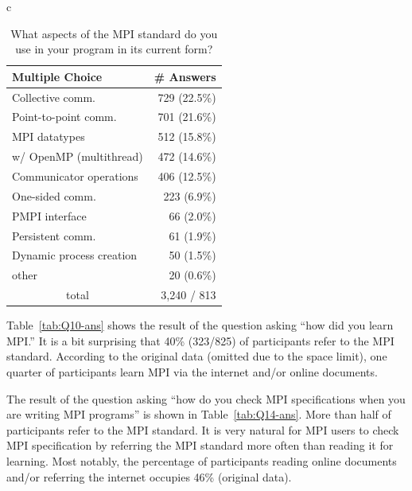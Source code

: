 \documentclass[sigconf,nonacm]{acmart}
\begin{document}
\begin{table}[htb]
\begin{center}
\begin{tabular}{c}
\hspace{1mm}
\begin{minipage}{0.24\hsize}
\begin{center}
\caption{\footnotesize What aspects of the MPI standard do you use in your program in its current form?}%
\label{tab:Q17-ans}%
\begin{tabular}{l|r}%
\hline%
Multiple Choice & \# Answers \\%
\hline%
Collective comm. & 729 (22.5\%) \\%
Point-to-point comm. & 701 (21.6\%) \\%
MPI datatypes & 512 (15.8\%) \\%
w/ OpenMP (multithread) & 472 (14.6\%) \\%
Communicator operations & 406 (12.5\%) \\%
One-sided comm. & 223 (6.9\%) \\%
PMPI interface & 66 (2.0\%) \\%
Persistent comm. & 61 (1.9\%) \\%
Dynamic process creation & 50 (1.5\%) \\%
other & 20 (0.6\%) \\%
\hline%
\multicolumn{1}{c}{total} & 3,240 / 813 \\%
\hline%
\end{tabular}%
\end{center}
\end{minipage}

\end{tabular}%
\end{center}%
\vspace{-3mm}
\end{table}%

Table~\ref{tab:Q10-ans} shows the result of the question asking ``how
did you learn MPI.'' It is a bit surprising that 40\% (323/825) of
participants refer to the MPI standard. According to the original
data (omitted due to the space limit), one quarter of participants
learn MPI via the internet and/or online documents. 

The result of the question asking ``how do you check MPI
specifications when you are writing MPI programs'' is shown in
Table~\ref{tab:Q14-ans}. More than half of participants refer to the
MPI standard. It is very natural for MPI users to check MPI
specification by referring the MPI standard more often than reading it
for learning. Most notably, the percentage of participants reading
online documents and/or referring the internet occupies 46\% (original
data). 
\end{document}
